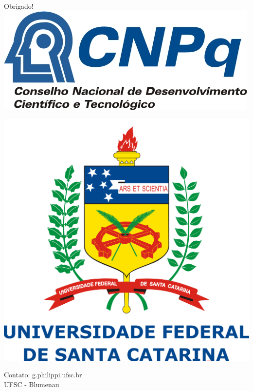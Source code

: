 \documentclass[10pt]{beamer}
\theoremstyle{plain}
\theoremstyle{definition}
\begin{document}
	\begin{frame}
		\begin{center}
			\vspace{1.5cm}
			Obrigado!\\
			\hspace{-5.5cm}
			\includegraphics[scale=2.2]{logo.png}
			
			\vspace{-2.7cm}
			\hspace{5.5cm}
			\includegraphics[scale=0.038]{logo_ufsc.png}
			
			\vspace{0.5cm}
			Contato: g.philippi\@grad.ufsc.br\\ UFSC - Blumenau
		\end{center}
	\end{frame}
	
\end{document}
